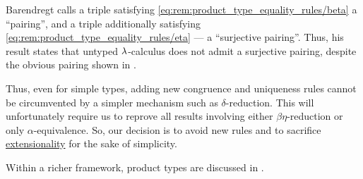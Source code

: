 \begin{remark}
  Barendregt calls a triple satisfying \eqref{eq:rem:product_type_equality_rules/beta} a \enquote{pairing}, and a triple additionally satisfying \eqref{eq:rem:product_type_equality_rules/eta} --- a \enquote{surjective pairing}. Thus, his result states that untyped \( {\mathrm \lambda} \)-calculus does not admit a surjective pairing, despite the obvious pairing shown in .

  Thus, even for simple types, adding new congruence and uniqueness rules cannot be circumvented by a simpler mechanism such as \( \delta \)-reduction. This will unfortunately require us to reprove all results involving either \( \beta\eta \)-reduction or only \( \alpha \)-equivalence. So, our decision is to avoid new rules and to sacrifice \hyperref[con:extensionality]{extensionality} for the sake of simplicity.
\end{remark}
\begin{comments}
  \item Within a richer framework, product types are discussed in .
\end{comments}

